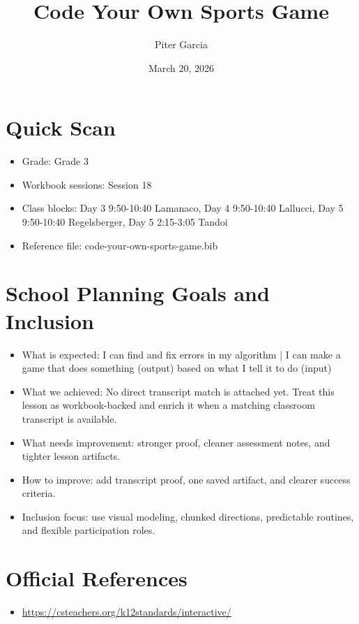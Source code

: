 \documentclass[11pt]{article}
\title{Code Your Own Sports Game}
\author{Piter Garcia}
\date{March 20, 2026}
\begin{document}
\maketitle
\section*{Quick Scan}
\begin{itemize}[leftmargin=*]
\item Grade: Grade 3
\item Workbook sessions: Session 18
\item Class blocks: Day 3 9:50-10:40 Lamanaco, Day 4 9:50-10:40 Lallucci, Day 5 9:50-10:40 Regelsberger, Day 5 2:15-3:05 Tandoi
\item Reference file: code-your-own-sports-game.bib
\end{itemize}
\section*{School Planning Goals and Inclusion}
\begin{itemize}[leftmargin=*]
\item What is expected: I can find and fix errors in my algorithm | I can make a game that does something (output) based on what I tell it to do (input)
\item What we achieved: No direct transcript match is attached yet. Treat this lesson as workbook-backed and enrich it when a matching classroom transcript is available.
\item What needs improvement: stronger proof, cleaner assessment notes, and tighter lesson artifacts.
\item How to improve: add transcript proof, one saved artifact, and clearer success criteria.
\item Inclusion focus: use visual modeling, chunked directions, predictable routines, and flexible participation roles.
\end{itemize}
\section*{Official References}
\begin{itemize}[leftmargin=*]
\item \url{https://csteachers.org/k12standards/interactive/}

\end{itemize}
\end{document}
